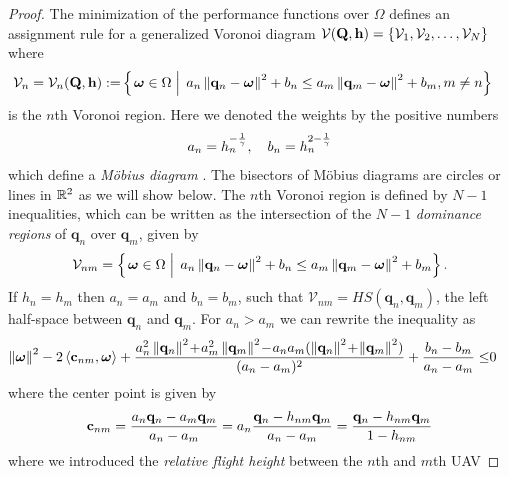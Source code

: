 \documentclass[smallabstract,smallcaptions]{dccpaper}
\newif\ifproof\prooffalse %
\renewcommand{\vp}{\mathbf q}
\renewcommand{\vP}{\mathbf Q}
\newcommand{\gP}{\ensuremath{\vP}}          %
\newcommand{\bH}{\ensuremath{\vh}}          %
\newcommand{\Vor}{\ensuremath{\mathcal{V}}}         %
\begin{document}
%
\ifproof
\begin{proof}
  The minimization of the performance functions over $\Omega$ defines an assignment rule for a generalized Voronoi diagram
  $\Vor(\gP,\bH)=\{\Vor_1,\Vor_2,\dots,\Vor_N\}$ where 
  \begin{align}
    \Vor_{n} =\Vor_n(\gP,\bH):=
      &\set{\vome\in\Ome}{ a_n\Norm{\vp_n-\vome}^2 +b_n \leq  a_m\Norm{\vp_m-\vome}^2 +b_m, m\not=n}
  \end{align}
  is the $n$th Voronoi region. Here we denoted the weights by the positive numbers
  \begin{align}
    a_n = h_n^{-\frac{1}{\gamma}}, \quad b_n=h_n^{2-\frac{1}{\gamma}}
  \end{align}
  which define a \emph{M{\"o}bius diagram} \cite{BK06b,BWY07}. The bisectors of M{\"o}bius diagrams are circles or lines
  in ${\mathbb R}^2$ as we will show below.
  The $n$th Voronoi region is defined by $N-1$ inequalities, which  can be written as the intersection of the $N-1$
  \emph{dominance regions} of $\vp_n$ over $\vp_m$, given by 
  \begin{align}
    \Vor_{nm}=\set{\vome\in\Ome}{ a_n\Norm{\vp_n-\vome}^2 +b_n \leq  a_m\Norm{\vp_m-\vome}^2 +b_m}.
  \end{align}
  If $h_n=h_m$ then $a_n=a_m$ and $b_n=b_m$, such that $\Vor_{nm}=HS(\vp_n,\vp_m)$, the left half-space between $\vp_n$
  and $\vp_m$. For $a_n>a_m$ we can rewrite the inequality as 
  \begin{align*}
      \Norm{\vome}^2 -2 \skprod{\vc_{nm}}{\vome} + 
         \frac{a_n^2 \Norm{\vp_n}^2 \!+\!a_m^2 \Norm{\vp_m}^2 \!-\! a_na_m(\Norm{\vp_n}^2 \!+\!\Norm{\vp_m}^2)}{(a_n-a_m)^2} 
         + \frac{b_n-b_m}{a_n-a_m} \leq & 0
  \end{align*}
  where the center point is given by
  \begin{align}
    \vc_{nm}=\frac{a_n\vp_n- a_m\vp_m}{a_n-a_m}=a_n \frac{\vp_n-h_{nm} \vp_m}{a_n -a_m}=\frac{\vp_n -h_{nm}\vp_m}{1-h_{nm}} 
  \end{align}
  where we introduced the \emph{relative flight height} between the $n$th and $m$th UAV

\end{proof}
\end{document}
